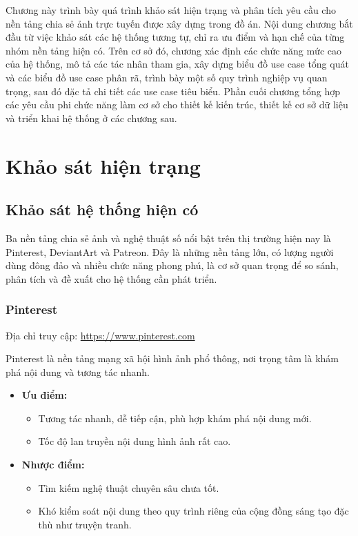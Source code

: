 Chương này trình bày quá trình khảo sát hiện trạng và phân tích yêu cầu cho nền tảng chia sẻ ảnh trực tuyến được xây dựng trong đồ án. Nội dung chương bắt đầu từ việc khảo sát các hệ thống tương tự, chỉ ra ưu điểm và hạn chế của từng nhóm nền tảng hiện có. Trên cơ sở đó, chương xác định các chức năng mức cao của hệ thống, mô tả các tác nhân tham gia, xây dựng biểu đồ use case tổng quát và các biểu đồ use case phân rã, trình bày một số quy trình nghiệp vụ quan trọng, sau đó đặc tả chi tiết các use case tiêu biểu. Phần cuối chương tổng hợp các yêu cầu phi chức năng làm cơ sở cho thiết kế kiến trúc, thiết kế cơ sở dữ liệu và triển khai hệ thống ở các chương sau.

\section{Khảo sát hiện trạng}
\label{section:2.1}

\subsection{Khảo sát hệ thống hiện có}
\label{subsection:2.1.1}
Ba nền tảng chia sẻ ảnh và nghệ thuật số nổi bật trên thị trường hiện nay là Pinterest, DeviantArt và Patreon. Đây là những nền tảng lớn, có lượng người dùng đông đảo và nhiều chức năng phong phú, là cơ sở quan trọng để so sánh, phân tích và đề xuất cho hệ thống cần phát triển.

\subsubsection*{Pinterest}
Địa chỉ truy cập: \url{https://www.pinterest.com}

Pinterest là nền tảng mạng xã hội hình ảnh phổ thông, nơi trọng tâm là khám phá nội dung và tương tác nhanh.
\begin{itemize}
  \item \textbf{Ưu điểm:}
  \begin{itemize}
    \item Tương tác nhanh, dễ tiếp cận, phù hợp khám phá nội dung mới.
    \item Tốc độ lan truyền nội dung hình ảnh rất cao.
  \end{itemize}
  \item \textbf{Nhược điểm:}
  \begin{itemize}
    \item Tìm kiếm nghệ thuật chuyên sâu chưa tốt.
    \item Khó kiểm soát nội dung theo quy trình riêng của cộng đồng sáng tạo đặc thù như truyện tranh.
  \end{itemize}
\end{itemize}

